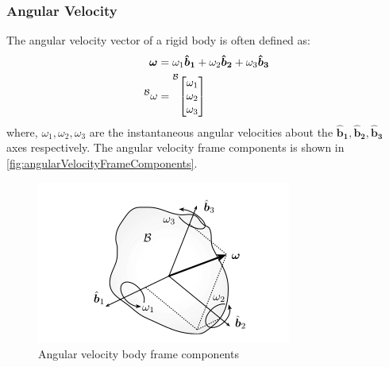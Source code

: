 \subsubsection*{Angular Velocity}
The angular velocity vector of a rigid body is often defined as:
\[
	\begin{aligned}
		\bm{\omega }                       & = \omega _1 \bm{{\hat{b}_{1}}} + \omega _2 \bm{{\hat{b}_{2}}} + \omega _3 \bm{{\hat{b}_{3}}} \\
		\prescript{\mathcal{B}}{}{\omega } & = \prescript{\mathcal{B}}{}{
			\begin{bmatrix}
				\omega _1 \\
				\omega _2 \\
				\omega _3
			\end{bmatrix}
		}
	\end{aligned}
\]
where, \(\omega _1, \omega _2, \omega _3 \) are the instantaneous angular velocities about the \(\bm{{\hat{b}_{1}}} , \bm{{\hat{b}_{2}}} , \bm{{\hat{b}_{3}}} \) axes respectively. The angular velocity frame components is shown in \autoref{fig:angularVelocityFrameComponents}.
\begin{figure}[H]
	\centering
	\includegraphics[width=0.5\linewidth]{figures/dynamics/angular_vel.png}
	\caption{Angular velocity body frame components}
	\label{fig:angularVelocityFrameComponents}
\end{figure}

